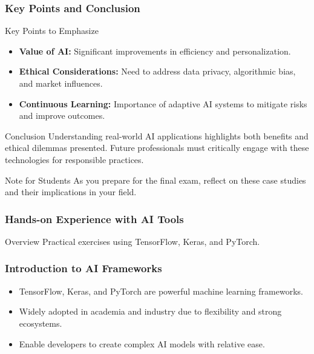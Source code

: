 \documentclass{beamer}
\begin{document}
\begin{frame}[fragile]
    \frametitle{Key Points and Conclusion}
    \begin{block}{Key Points to Emphasize}
        \begin{itemize}
            \item \textbf{Value of AI:} Significant improvements in efficiency and personalization.
            \item \textbf{Ethical Considerations:} Need to address data privacy, algorithmic bias, and market influences.
            \item \textbf{Continuous Learning:} Importance of adaptive AI systems to mitigate risks and improve outcomes.
        \end{itemize}
    \end{block}

    \begin{block}{Conclusion}
        Understanding real-world AI applications highlights both benefits and ethical dilemmas presented. Future professionals must critically engage with these technologies for responsible practices.
    \end{block}

    \begin{block}{Note for Students}
        As you prepare for the final exam, reflect on these case studies and their implications in your field.
    \end{block}
\end{frame}

\begin{frame}
    \frametitle{Hands-on Experience with AI Tools}
    \begin{block}{Overview}
        Practical exercises using TensorFlow, Keras, and PyTorch.
    \end{block}
\end{frame}

\begin{frame}
    \frametitle{Introduction to AI Frameworks}
    \begin{itemize}
        \item TensorFlow, Keras, and PyTorch are powerful machine learning frameworks.
        \item Widely adopted in academia and industry due to flexibility and strong ecosystems.
        \item Enable developers to create complex AI models with relative ease.
    \end{itemize}
\end{frame}
\end{document}
